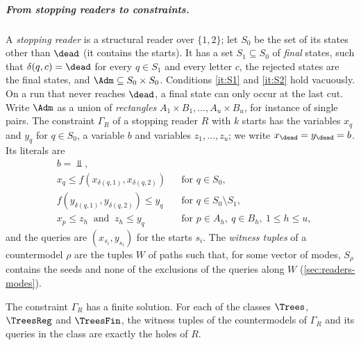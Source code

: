 \subparagraph*{From stopping readers to constraints.}
A \emph{stopping reader} is a structural reader over $\{1,2\}$; let $S_0$
be the set of its states other than $\dead$ (it contains the starts). It has a set
$S_1\subseteq S_0$ of \emph{final} states, such that $\delta(q,c)=\dead$ for
every $q\in S_1$ and every letter $c$, the rejected states are the final
states, and $\Adm\subseteq S_0\times S_0$. Conditions \ref{it:S1} and
\ref{it:S2} hold vacuously. On a run that never reaches $\dead$, a final
state can only occur at the last cut. Write $\Adm$ as a union of
\emph{rectangles} $A_1\times B_1,\dots,A_u\times B_u$, for instance of
single pairs. The constraint $\Gamma_R$ of a stopping reader $R$ with $k$
starts has the variables $x_q$ and $y_q$ for $q\in S_0$, a variable $b$ and
variables $z_1,\dots,z_u$; we write $x_\dead=y_\dead=b$. Its literals are
\begin{align*}
 & b=\Bot, \\
 & x_q\le f(x_{\delta(q,1)},x_{\delta(q,2)}) && \text{for }q\in S_0,\\
 & f(y_{\delta(q,1)},y_{\delta(q,2)})\le y_q && \text{for }q\in S_0\setminus S_1,\\
 & x_p\le z_h\ \text{ and }\ z_h\le y_q && \text{for }p\in A_h,\ q\in B_h,
   \ 1\le h\le u,
\end{align*}
and the queries are $(x_{s_i},y_{s_i})$ for the starts $s_i$. The
\emph{witness tuples} of a countermodel $\rho$ are the tuples $W$ of paths
such that, for some vector of modes, $S_\rho$ contains the seeds and none of
the exclusions of the queries along $W$ (\cref{sec:readers-modes}).

\begin{lemma}\label{lem:stopping}
The constraint $\Gamma_R$ has a finite solution. For each of the classes
$\Trees$, $\TreesReg$ and $\TreesFin$, the witness tuples of the
countermodels of $\Gamma_R$ and its queries in the class are exactly the
holes of $R$.
\end{lemma}

